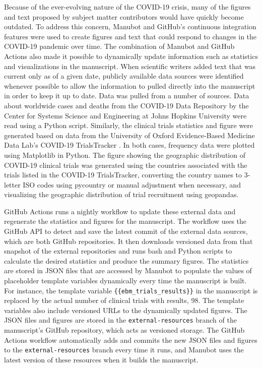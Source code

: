 \documentclass[sigconf]{acmart}
\begin{document}
Because of the ever-evolving nature of the COVID-19 crisis, many of the figures and text proposed by subject matter contributors would have quickly become outdated.
To address this concern, Manubot and GitHub's continuous integration features were used to create figures and text that could respond to changes in the COVID-19 pandemic over time.
The combination of Manubot and GitHub Actions also made it possible to dynamically update information such as statistics and visualizations in the manuscript.
When scientific writers added text that was current only as of a given date, publicly available data sources were identified whenever possible to allow the information to pulled directly into the manuscript in order to keep it up to date.
Data was pulled from a number of sources.
Data about worldwide cases and deaths from the COVID-19 Data Repository by the Center for Systems Science and Engineering at Johns Hopkins University \citep{MrwDDw9R} were read using a Python script.
Similarly, the clinical trials statistics and figure were generated based on data from the University of Oxford Evidence-Based Medicine Data Lab's COVID-19 TrialsTracker \citep{SSbnPnzT}.
In both cases, frequency data were plotted using Matplotlib \citep{1026Gxdsi} in Python.
The figure showing the geographic distribution of COVID-19 clinical trials was generated using the countries associated with the trials listed in the COVID-19 TrialsTracker, converting the country names to 3-letter ISO codes using pycountry or manual adjustment when necessary, and visualizing the geographic distribution of trial recruitment using geopandas.

GitHub Actions runs a nightly workflow to update these external data and regenerate the statistics and figures for the manuscript.
The workflow uses the GitHub API to detect and save the latest commit of the external data sources, which are both GitHub repositories.
It then downloads versioned data from that snapshot of the external repositories and runs bash and Python scripts to calculate the desired statistics and produce the summary figures.
The statistics are stored in JSON files that are accessed by Manubot to populate the values of placeholder template variables dynamically every time the manuscript is built.
For instance, the template variable \texttt{\{\{ebm\_trials\_results\}\}} in the manuscript is replaced by the actual number of clinical trials with results, 98.
The template variables also include versioned URLs to the dynamically updated figures.
The JSON files and figures are stored in the \texttt{external-resources} branch of the manuscript's GitHub repository, which acts as versioned storage.
The GitHub Actions workflow automatically adds and commits the new JSON files and figures to the \texttt{external-resources} branch every time it runs, and Manubot uses the latest version of these resources when it builds the manuscript.
\end{document}
